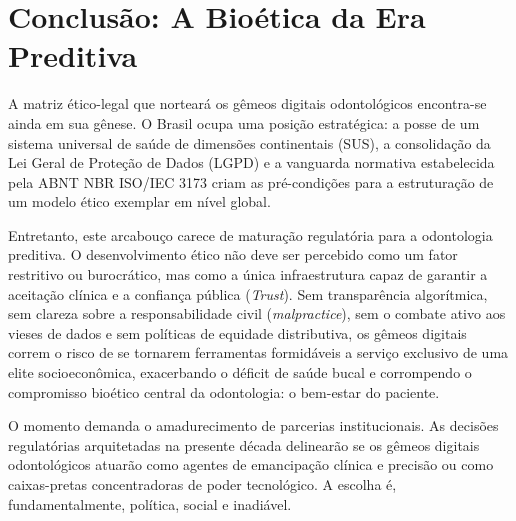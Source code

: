 \section{Conclusão: A Bioética da Era Preditiva}
\label{sec:conclusao}

A matriz ético-legal que norteará os gêmeos digitais odontológicos encontra-se ainda em sua gênese. O Brasil ocupa uma posição estratégica: a posse de um sistema universal de saúde de dimensões continentais (SUS), a consolidação da Lei Geral de Proteção de Dados (LGPD) e a vanguarda normativa estabelecida pela ABNT NBR ISO/IEC 3173 \cite{abinc2026brasil} criam as pré-condições para a estruturação de um modelo ético exemplar em nível global.

Entretanto, este arcabouço carece de maturação regulatória para a odontologia preditiva. O desenvolvimento ético não deve ser percebido como um fator restritivo ou burocrático, mas como a única infraestrutura capaz de garantir a aceitação clínica e a confiança pública (\textit{Trust}). Sem transparência algorítmica, sem clareza sobre a responsabilidade civil (\textit{malpractice}), sem o combate ativo aos vieses de dados e sem políticas de equidade distributiva, os gêmeos digitais correm o risco de se tornarem ferramentas formidáveis a serviço exclusivo de uma elite socioeconômica, exacerbando o déficit de saúde bucal e corrompendo o compromisso bioético central da odontologia: o bem-estar do paciente.

O momento demanda o amadurecimento de parcerias institucionais. As decisões regulatórias arquitetadas na presente década delinearão se os gêmeos digitais odontológicos atuarão como agentes de emancipação clínica e precisão ou como caixas-pretas concentradoras de poder tecnológico. A escolha é, fundamentalmente, política, social e inadiável.

